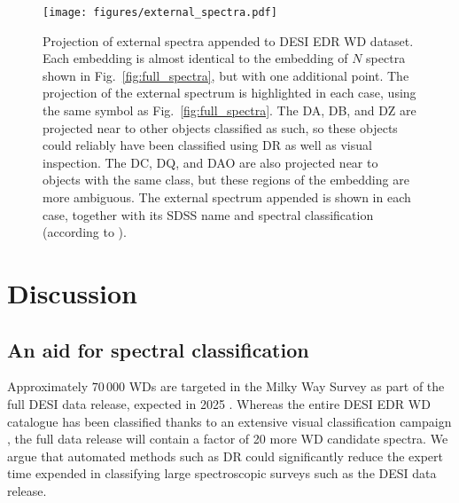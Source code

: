 \documentclass[fleqn,usenatbib]{mnras}
\begin{document}
\begin{figure*}
\texttt{[image: figures/external\_spectra.pdf]}
\caption{
    Projection of external spectra appended to DESI EDR WD dataset.
    Each embedding is almost identical to the embedding of $N$ spectra shown in Fig.~\ref{fig:full_spectra}, but with one additional point.
    The projection of the external spectrum is highlighted in each case, using the same symbol as Fig.~\ref{fig:full_spectra}.
    The DA, DB, and DZ are projected near to other objects classified as such, so these objects could reliably have been classified using DR as well as visual inspection.
    The DC, DQ, and DAO are also projected near to objects with the same class, but these regions of the embedding are more ambiguous.
    The external spectrum appended is shown in each case, together with its SDSS name and spectral classification (according to \citealt{gentilefusillo19}).
}
\label{fig:external_spectra}
\end{figure*}



\section{Discussion}
\label{sec:discussion}

\subsection{An aid for spectral classification}

Approximately $70\,000$ WDs are targeted in the Milky Way Survey as part of the full DESI data release, expected in 2025 \citep{cooper23}.
Whereas the entire DESI EDR WD catalogue has been classified thanks to an extensive visual classification campaign \citep{manser24}, the full data release will contain a factor of 20 more WD candidate spectra.
We argue that automated methods such as DR could significantly reduce the expert time expended in classifying large spectroscopic surveys such as the DESI data release.
\end{document}
